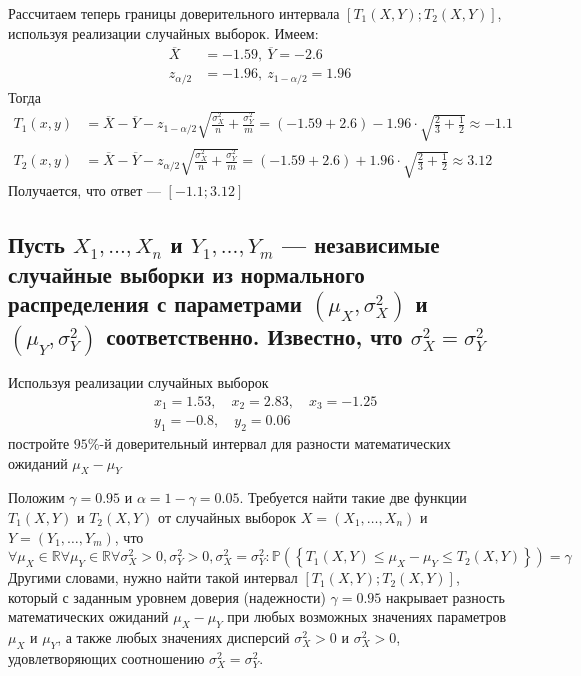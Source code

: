 \documentclass{article}
\begin{document}
Рассчитаем теперь границы доверительного интервала $\left[T_{1}(X, Y) ; T_{2}(X, Y)\right]$, используя реализации случайных выборок. Имеем:
\begin{equation*}
    \begin{aligned}
        \overline{X}&=-1.59,\ \overline{Y}=-2.6\\
        z_{\alpha / 2}&=-1.96,\ z_{1-\alpha / 2}=1.96
    \end{aligned}
\end{equation*}
Тогда
\begin{equation*}
    \begin{aligned}
        T_{1}(x, y)&=\overline{X}-\overline{Y}-z_{1-\alpha / 2} \sqrt{\frac{\sigma_{X}^{2}}{n}+\frac{\sigma_{Y}^{2}}{m}}=(-1.59+2.6)-1.96\cdot\sqrt{\frac{2}{3}+\frac{1}{2}}\approx-1.1\\
        T_{2}(x, y)&=\overline{X}-\overline{Y}-z_{\alpha / 2} \sqrt{\frac{\sigma_{X}^{2}}{n}+\frac{\sigma_{Y}^{2}}{m}}=(-1.59+2.6)+1.96\cdot\sqrt{\frac{2}{3}+\frac{1}{2}}\approx3.12
    \end{aligned}
\end{equation*}
Получается, что ответ — $[-1.1;3.12]$

\subsection{Пусть $X_{1}, \ldots, X_{n}$ и $Y_{1}, \ldots, Y_{m}$ — независимые случайные выборки из нормального распределения с параметрами $\left(\mu_{X}, \sigma_{X}^{2}\right)$ и $\left(\mu_{Y}, \sigma_{Y}^{2}\right)$ соответственно. Известно, что $\sigma_{X}^{2}=\sigma_{Y}^{2}$}
Используя реализации случайных выборок
\begin{equation*}
    \begin{aligned}
        & x_{1}=1.53, \quad x_{2}=2.83, \quad x_{3}=-1.25 \\
        & y_{1}=-0.8, \quad y_{2}=0.06
    \end{aligned}
\end{equation*}
постройте $95 \%$-й доверительный интервал для разности математических ожиданий $\mu_{X}-\mu_{Y}$

Положим $\gamma=0.95$ и $\alpha=1-\gamma=0.05$. Требуется найти такие две функции $T_{1}(X, Y)$ и $T_{2}(X, Y)$ от случайных выборок $X=\left(X_{1}, \ldots, X_{n}\right)$ и $Y=\left(Y_{1}, \ldots, Y_{m}\right)$, что
\begin{equation*}
    \forall \mu_{X} \in \mathbb{R} \forall \mu_{Y} \in \mathbb{R} \forall \sigma_{X}^{2}>0, \sigma_{Y}^{2}>0, \sigma_{X}^{2}=\sigma_{Y}^{2}: \mathbb{P}\left(\left\{T_{1}(X, Y) \leq \mu_{X}-\mu_{Y} \leq T_{2}(X, Y)\right\}\right)=\gamma
\end{equation*}
Другими словами, нужно найти такой интервал $\left[T_{1}(X, Y) ; T_{2}(X, Y)\right]$, который с заданным уровнем доверия (надежности) $\gamma=0.95$ накрывает разность математических ожиданий $\mu_{X}-\mu_{Y}$ при любых возможных значениях параметров $\mu_{X}$ и $\mu_{Y}$, а также любых значениях дисперсий $\sigma_{X}^{2}>0$ и $\sigma_{X}^{2}>0$, удовлетворяющих соотношению $\sigma_{X}^{2}=\sigma_{Y}^{2}$.
\end{document}
